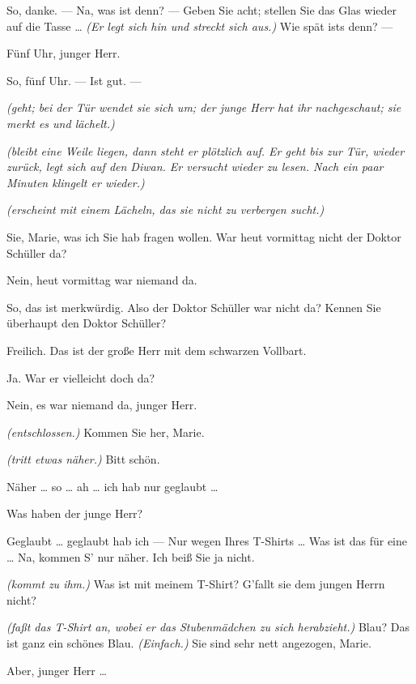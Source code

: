 \documentclass[
	final,
	a4paper,
	ngerman,
	mpinclude = true, %
	twoside = true,
	open = right,
	cleardoublepage = plain,
	DIV = 13,
	BCOR = 1cm,
	titlepage = firstiscover,
	]{scrbook}
\newcommand{\direction}[1]{\textit{(#1)}}
\newcommand{\thecharacter}[1]{\textup{\textsc{#1}}\xspace}
\newcommand{\thepraktikant}{\thecharacter{Praktikant}}
\newcommand{\theherr}{\thecharacter{Junger Herr}}
\newcommand{\character}[1]{\item[#1:]}
\newcommand{\praktikant}{\character{\thepraktikant}}
\newcommand{\herr}{\character{\theherr}}
\begin{document}
\begin{play}
	\herr
	So, danke. --- Na, was ist denn? --- Geben Sie acht; stellen Sie das Glas wieder auf die Tasse \ldots{} \direction{Er legt sich hin und streckt sich aus.} Wie spät ists denn? ---

	\praktikant
	Fünf Uhr, junger Herr.

	\herr
	So, fünf Uhr. --- Ist gut. ---

	\praktikant
	\direction{geht; bei der Tür wendet sie sich um; der junge Herr hat ihr nachgeschaut; sie merkt es und lächelt.}

	\herr
	\direction{bleibt eine Weile liegen, dann steht er plötzlich auf. Er geht bis zur Tür, wieder zurück, legt sich auf den Diwan. Er versucht wieder zu lesen. Nach ein paar Minuten klingelt er wieder.}

	\praktikant
	\direction{erscheint mit einem Lächeln, das sie nicht zu verbergen sucht.}

	\herr
	Sie, Marie, was ich Sie hab fragen wollen. War heut vormittag nicht der Doktor Schüller da?

	\praktikant
	Nein, heut vormittag war niemand da.

	\herr
	So, das ist merkwürdig. Also der Doktor Schüller war nicht da? Kennen Sie überhaupt den Doktor Schüller?

	\praktikant
	Freilich. Das ist der große Herr mit dem schwarzen Vollbart.

	\herr
	Ja. War er vielleicht doch da?

	\praktikant
	Nein, es war niemand da, junger Herr.

	\herr
	\direction{entschlossen.} Kommen Sie her, Marie.

	\praktikant
	\direction{tritt etwas näher.} Bitt schön.

	\herr
	Näher \ldots{} so \ldots{} ah \ldots{} ich hab nur geglaubt \ldots{}

	\praktikant
	Was haben der junge Herr?

	\herr
	Geglaubt \ldots{} geglaubt hab ich --- Nur wegen Ihres T-Shirts \ldots{} Was ist das für eine \ldots{} Na, kommen S' nur näher. Ich beiß Sie ja nicht.

	\praktikant
	\direction{kommt zu ihm.} Was ist mit meinem T-Shirt? G'fallt sie dem jungen Herrn nicht?

	\herr
	\direction{faßt das T-Shirt an, wobei er das Stubenmädchen zu sich herabzieht.} Blau? Das ist ganz ein schönes Blau. \direction{Einfach.} Sie sind sehr nett angezogen, Marie.

	\praktikant
	Aber, junger Herr \ldots{}


\end{play}
\end{document}
